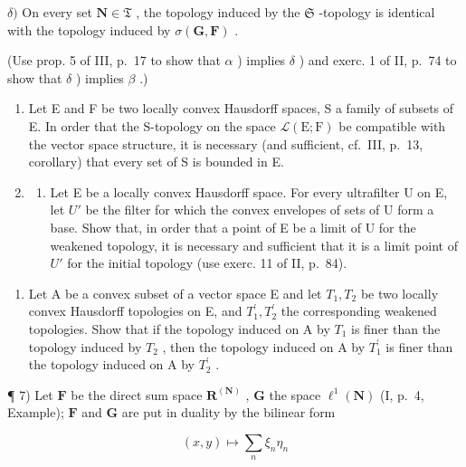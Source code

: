 \(\delta)\) On every set \(\mathbf{N} \in \mathfrak{T}\) , the topology induced by the \(\mathfrak{S}\) -topology is identical with the topology induced by \(\sigma(\mathbf{G}, \mathbf{F})\) .

(Use prop. 5 of III, p.~17 to show that \(\alpha\) ) implies \(\delta\) ) and exerc. 1 of II, p.~74 to show that \(\delta\) ) implies \(\beta\) .)

\begin{enumerate}
\def\labelenumi{\arabic{enumi})}
\setcounter{enumi}{4}
\item
  Let E and F be two locally convex Hausdorff spaces, S a family of subsets of E. In order that the S-topology on the space \(\mathcal{L}(\mathrm{E};\mathrm{F})\) be compatible with the vector space structure, it is necessary (and sufficient, cf.~III, p.~13, corollary) that every set of S is bounded in E.
\item
  \begin{enumerate}
  \def\labelenumii{\alph{enumii})}
  \tightlist
  \item
    Let E be a locally convex Hausdorff space. For every ultrafilter U on E, let \(U'\) be the filter for which the convex envelopes of sets of U form a base. Show that, in order that a point of E be a limit of U for the weakened topology, it is necessary and sufficient that it is a limit point of \(U'\) for the initial topology (use exerc. 11 of II, p.~84).
  \end{enumerate}
\end{enumerate}

\begin{enumerate}
\def\labelenumi{\alph{enumi})}
\setcounter{enumi}{1}
\tightlist
\item
  Let A be a convex subset of a vector space E and let \(T_{1}, T_{2}\) be two locally convex Hausdorff topologies on E, and \(T_{1}^{\prime}, T_{2}^{\prime}\) the corresponding weakened topologies. Show that if the topology induced on A by \(T_{1}\) is finer than the topology induced by \(T_{2}\) , then the topology induced on A by \(T_{1}^{\prime}\) is finer than the topology induced on A by \(T_{2}^{\prime}\) .
\end{enumerate}

¶ 7) Let \(\mathbf{F}\) be the direct sum space \(\mathbf{R}^{(\mathbf{N})}\) , \(\mathbf{G}\) the space \(\ell^1 (\mathbf{N})\) (I, p.~4, Example); \(\mathbf{F}\) and \(\mathbf{G}\) are put in duality by the bilinear form

\[
(x, y) \mapsto \sum_ {n} \xi_ {n} \eta_ {n}
\]

